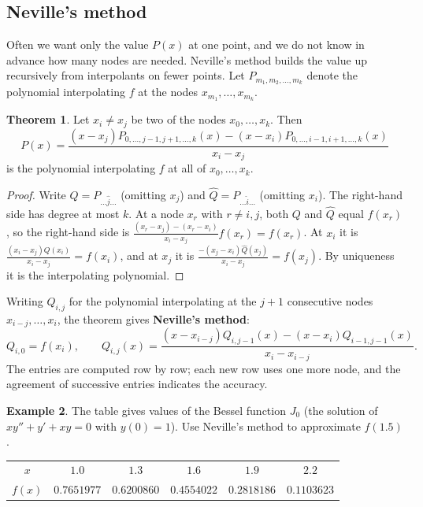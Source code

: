 \documentclass[11pt,a4paper]{article}
\numberwithin{equation}{section}
\theoremstyle{definition}
\newtheorem{thm}{Theorem}[subsection]
\newtheorem{exa}[thm]{Example}
\begin{document}
\subsection{Neville's method}
\label{sec:neville}

Often we want only the value $P(x)$ at one point, and we do not know in advance how many nodes are needed. Neville's method builds the
value up recursively from interpolants on fewer points. Let $P_{m_1,m_2,\dots,m_k}$ denote the polynomial interpolating $f$ at the nodes
$x_{m_1},\dots,x_{m_k}$.

\begin{thm}
\label{thm:neville}
Let $x_i\neq x_j$ be two of the nodes $x_0,\dots,x_k$. Then
$$P(x) = \frac{(x-x_j)P_{0,\dots,j-1,j+1,\dots,k}(x)-(x-x_i)P_{0,\dots,i-1,i+1,\dots,k}(x)}{x_i-x_j}$$
is the polynomial interpolating $f$ at all of $x_0,\dots,x_k$.
\end{thm}

\begin{proof}
Write $Q = P_{\dots\hat j\dots}$ (omitting $x_j$) and $\hat Q = P_{\dots\hat i\dots}$ (omitting $x_i$). The right-hand side has degree at most $k$.
At a node $x_r$ with $r\neq i,j$, both $Q$ and $\hat Q$ equal $f(x_r)$, so the right-hand side is $\frac{(x_r-x_j)-(x_r-x_i)}{x_i-x_j}f(x_r) = f(x_r)$.
At $x_i$ it is $\frac{(x_i-x_j)Q(x_i)}{x_i-x_j} = f(x_i)$, and at $x_j$ it is $\frac{-(x_j-x_i)\hat Q(x_j)}{x_i-x_j} = f(x_j)$. By uniqueness it is the
interpolating polynomial.
\end{proof}

Writing $Q_{i,j}$ for the polynomial interpolating at the $j+1$ consecutive nodes $x_{i-j},\dots,x_i$, the theorem gives \textbf{Neville's
method}:
$$Q_{i,0} = f(x_i),\qquad Q_{i,j}(x) = \frac{(x-x_{i-j})Q_{i,j-1}(x)-(x-x_i)Q_{i-1,j-1}(x)}{x_i-x_{i-j}} .$$
The entries are computed row by row; each new row uses one more node, and the agreement of successive entries indicates the accuracy.

\begin{exa}
\label{exa:neville}
The table gives values of the Bessel function $J_0$ (the solution of $xy''+y'+xy = 0$ with $y(0) = 1$). Use Neville's method to
approximate $f(1.5)$.
\begin{center}
\begin{tabular}{cccccc}
\hline
$x$ & $1.0$ & $1.3$ & $1.6$ & $1.9$ & $2.2$\\
$f(x)$ & $0.7651977$ & $0.6200860$ & $0.4554022$ & $0.2818186$ & $0.1103623$\\
\hline
\end{tabular}
\end{center}
\end{exa}
\end{document}
